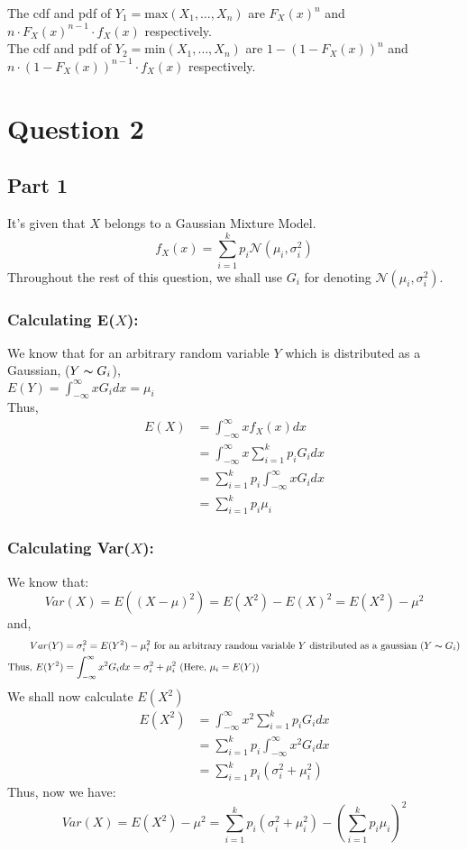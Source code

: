 \documentclass[11pt, fleqn]{article}
\begin{document}
The cdf and pdf of $Y_1 = \text{max}(X_1, \dots, X_n)$ are $F_X(x)^n$ and $n \cdot F_X(x)^{n-1} \cdot f_X(x)$ respectively. \\
The cdf and pdf of $Y_2 = \text{min}(X_1, \dots, X_n)$ are $1 - (1 - F_X(x))^n$ and $n \cdot (1 - F_X(x))^{n-1} \cdot f_X(x)$ respectively.







\newpage
\section*{Question 2}
\setcounter{equation}{0}

\subsection*{Part 1}
It's given that $X$ belongs to a Gaussian Mixture Model.\\
$$ f_X(x) = \sum_{i=1}^{k}p_i \mathcal{N}(\mu_i, \sigma_i^2) $$
Throughout the rest of this question, we shall use $G_i$ for denoting $\mathcal{N}(\mu_i, \sigma_i^2) $.
\subsubsection*{Calculating E($X$):}
We know that for an arbitrary random variable $Y$ which is distributed as a Gaussian, ($Y \thicksim G_i$), \\ $E(Y) = \int_{-\infty}^{\infty} x G_i dx = \mu_i$\\
Thus,
$$
\begin{aligned}
    E(X) &= \int_{-\infty}^{\infty}x f_X(x) dx\\
    &= \int_{-\infty}^{\infty} x \sum_{i=1}^{k}p_i G_i dx\\
    &= \sum_{i=1}^{k}p_i \int_{-\infty}^{\infty} x G_i dx\\
    &= \boxed{ \sum_{i=1}^{k}p_i \mu_i }
\end{aligned}
$$
\subsubsection*{Calculating Var($X$):}
We know that:
$$ 
Var(X) = E((X-\mu)^2) = E(X^2) - E(X)^2 = E(X^2) - \mu^2 $$
and,
$$
\begin{aligned}
Var(Y) &= \sigma_i^2 = E(Y^2)-\mu_i^2 \text{ for an arbitrary random variable $Y$ distributed as a gaussian } (Y \thicksim G_i)\\
\text{Thus, } E(Y^2) &= \int_{-\infty}^{\infty} x^2 G_i dx = \sigma_i^2+\mu_i^2 \text{ (Here, $\mu_i = E(Y))$}
\end{aligned}
$$
We shall now calculate $E(X^2)$
$$
\begin{aligned}
    E(X^2) &= \int_{-\infty}^{\infty} x^2 \sum_{i=1}^{k}p_i G_i dx\\
    &= \sum_{i=1}^{k}p_i \int_{-\infty}^{\infty} x^2 G_i dx\\
    &= \sum_{i=1}^{k}p_i (\sigma_i^2 + \mu_i^2)
\end{aligned}
$$
Thus, now we have:
$$
Var(X) = E(X^2)-\mu^2 = \boxed{ \sum_{i=1}^{k}p_i (\sigma_i^2 + \mu_i^2) - (\sum_{i=1}^{k}p_i \mu_i)^2 }
$$
\\
\end{document}
